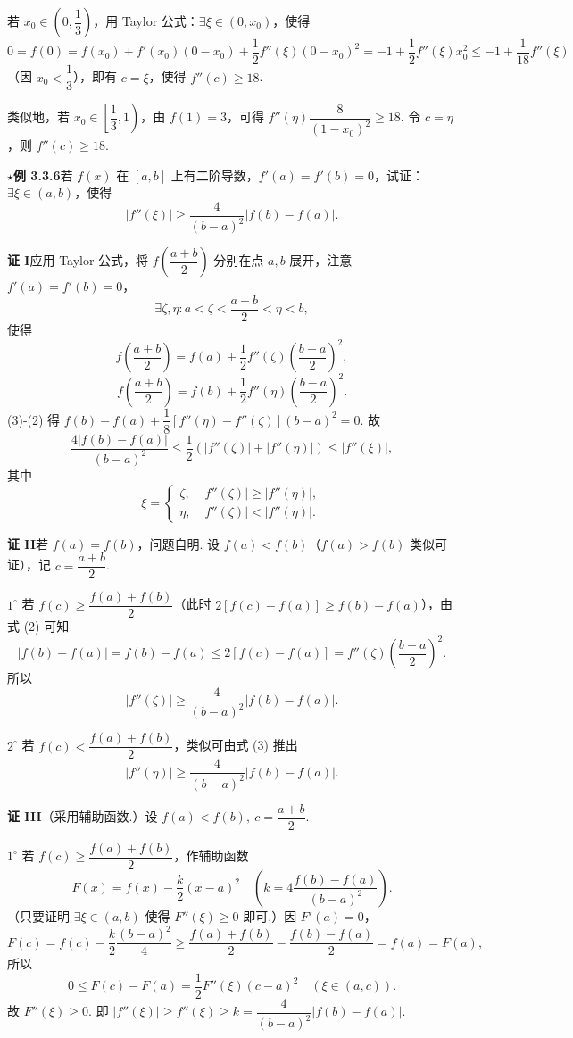 \documentclass[UTF8, 12pt, fontset=fandol, oneside]{ctexart}
\begin{document}
若 $x_0\in\left(0,\dfrac13\right)$，用 Taylor 公式：$\exists \xi\in(0,x_0)$，使得
\[
  0=f(0)=f(x_0)+f'(x_0)(0-x_0)+\frac12f''(\xi)(0-x_0)^2
  =-1+\frac12f''(\xi)x_0^2
  \le -1+\frac1{18}f''(\xi)
\]
（因 $x_0<\dfrac13$），即有 $c=\xi$，使得 $f''(c)\ge18$.

类似地，若 $x_0\in\left[\dfrac13,1\right)$，由 $f(1)=3$，可得 $f''(\eta)\dfrac{8}{(1-x_0)^2}\ge18$. 令 $c=\eta$，则 $f''(c)\ge18$.

\noindent\textbf{$\star$例 3.3.6}\quad 若 $f(x)$ 在 $[a,b]$ 上有二阶导数，$f'(a)=f'(b)=0$，试证：$\exists \xi\in(a,b)$，使得
\begin{equation}
  |f''(\xi)|\ge\frac4{(b-a)^2}|f(b)-f(a)|.
\tag{1}
\end{equation}

\noindent\textbf{证 I}\quad 应用 Taylor 公式，将 $f\left(\dfrac{a+b}{2}\right)$ 分别在点 $a,b$ 展开，注意 $f'(a)=f'(b)=0$，
\[
  \exists \zeta,\eta:a<\zeta<\frac{a+b}{2}<\eta<b,
\]
使得
\[
  f\left(\frac{a+b}{2}\right)=f(a)+\frac12f''(\zeta)\left(\frac{b-a}{2}\right)^2,
\tag{2}
\]
\[
  f\left(\frac{a+b}{2}\right)=f(b)+\frac12f''(\eta)\left(\frac{b-a}{2}\right)^2.
\tag{3}
\]
(3)-(2) 得 $f(b)-f(a)+\dfrac18[f''(\eta)-f''(\zeta)](b-a)^2=0$. 故
\[
  \frac{4|f(b)-f(a)|}{(b-a)^2}
  \le\frac12(|f''(\zeta)|+|f''(\eta)|)\le |f''(\xi)|,
\]
其中
\[
  \xi=
  \begin{cases}
    \zeta,& |f''(\zeta)|\ge |f''(\eta)|,\\
    \eta,& |f''(\zeta)|<|f''(\eta)|.
  \end{cases}
\]

\noindent\textbf{证 II}\quad 若 $f(a)=f(b)$，问题自明. 设 $f(a)<f(b)$（$f(a)>f(b)$ 类似可证），记 $c=\dfrac{a+b}{2}$.

$1^\circ$ 若 $f(c)\ge\dfrac{f(a)+f(b)}2$（此时 $2[f(c)-f(a)]\ge f(b)-f(a)$），由式 (2) 可知
\[
  |f(b)-f(a)|=f(b)-f(a)\le2[f(c)-f(a)]
  =f''(\zeta)\left(\frac{b-a}{2}\right)^2.
\]
所以
\[
  |f''(\zeta)|\ge\frac4{(b-a)^2}|f(b)-f(a)|.
\]

$2^\circ$ 若 $f(c)<\dfrac{f(a)+f(b)}2$，类似可由式 (3) 推出
\[
  |f''(\eta)|\ge\frac4{(b-a)^2}|f(b)-f(a)|.
\]

\noindent\textbf{证 III}\quad （采用辅助函数.）设 $f(a)<f(b),\ c=\dfrac{a+b}{2}$.

$1^\circ$ 若 $f(c)\ge\dfrac{f(a)+f(b)}2$，作辅助函数
\[
  F(x)=f(x)-\frac{k}{2}(x-a)^2
  \quad\left(k=4\frac{f(b)-f(a)}{(b-a)^2}\right).
\]
（只要证明 $\exists \xi\in(a,b)$ 使得 $F''(\xi)\ge0$ 即可.）因 $F'(a)=0$，
\[
  F(c)=f(c)-\frac{k}{2}\frac{(b-a)^2}{4}
  \ge\frac{f(a)+f(b)}2-\frac{f(b)-f(a)}2
  =f(a)=F(a),
\]
所以
\[
  0\le F(c)-F(a)=\frac12F''(\xi)(c-a)^2\quad(\xi\in(a,c)).
\]
故 $F''(\xi)\ge0$. 即 $|f''(\xi)|\ge f''(\xi)\ge k=\dfrac4{(b-a)^2}|f(b)-f(a)|$.
\end{document}
